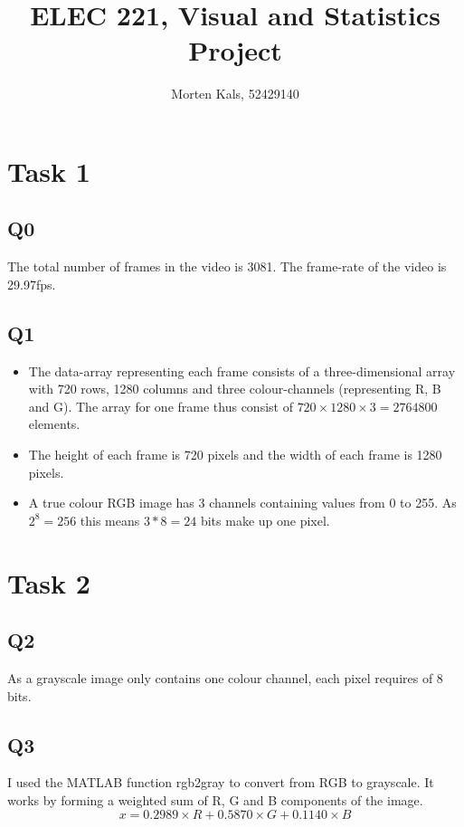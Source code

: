 \documentclass[11pt]{article}
\begin{document}
\title{ELEC 221, Visual and Statistics Project}
\author{Morten Kals, 52429140}
\maketitle

\section*{Task 1}

\subsection*{Q0}
The total number of frames in the video is 3081.
The frame-rate of the video is 29.97fps. 

\subsection*{Q1}
\begin{itemize}
	\item The data-array representing each frame consists of a three-dimensional array with 720 rows, 1280 columns and three colour-channels (representing R, B and G). The array for one frame thus consist of $720\times1280\times3=2 764 800$ elements. 
	\item The height of each frame is 720 pixels and the width of each frame is 1280 pixels. 
	\item A true colour RGB image has 3 channels containing values from 0 to 255. As $2^8=256$ this means $3*8=24$ bits make up one pixel. 
\end{itemize}


\section*{Task 2}

\subsection*{Q2}
As a grayscale image only contains one colour channel, each pixel requires of 8 bits. 

\subsection*{Q3}
I used the MATLAB function rgb2gray to convert from RGB to grayscale. It works by forming a weighted sum of R, G and B components of the image. \[x=0.2989\times R+0.5870\times G+0.1140\times B\]
\end{document}
